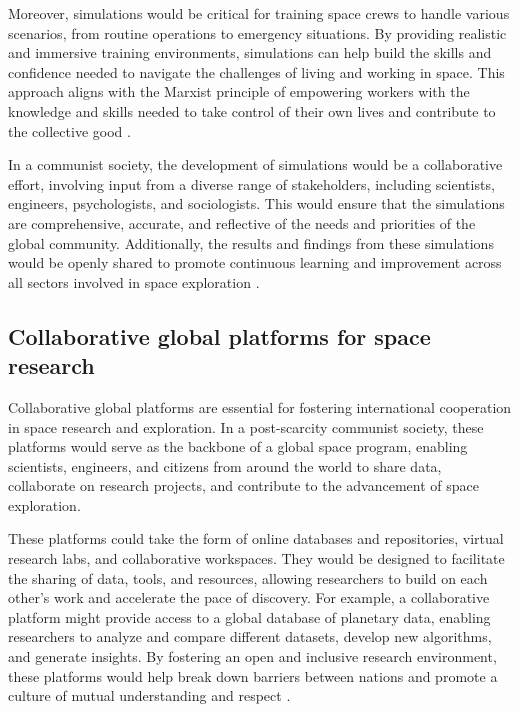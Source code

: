 Moreover, simulations would be critical for training space crews to handle various scenarios, from routine operations to emergency situations. By providing realistic and immersive training environments, simulations can help build the skills and confidence needed to navigate the challenges of living and working in space. This approach aligns with the Marxist principle of empowering workers with the knowledge and skills needed to take control of their own lives and contribute to the collective good \cite[pp.~67-70]{debord1967}.

In a communist society, the development of simulations would be a collaborative effort, involving input from a diverse range of stakeholders, including scientists, engineers, psychologists, and sociologists. This would ensure that the simulations are comprehensive, accurate, and reflective of the needs and priorities of the global community. Additionally, the results and findings from these simulations would be openly shared to promote continuous learning and improvement across all sectors involved in space exploration \cite[pp.~78-81]{bookchin1986}.

\subsection{Collaborative global platforms for space research}

Collaborative global platforms are essential for fostering international cooperation in space research and exploration. In a post-scarcity communist society, these platforms would serve as the backbone of a global space program, enabling scientists, engineers, and citizens from around the world to share data, collaborate on research projects, and contribute to the advancement of space exploration.

These platforms could take the form of online databases and repositories, virtual research labs, and collaborative workspaces. They would be designed to facilitate the sharing of data, tools, and resources, allowing researchers to build on each other's work and accelerate the pace of discovery. For example, a collaborative platform might provide access to a global database of planetary data, enabling researchers to analyze and compare different datasets, develop new algorithms, and generate insights. By fostering an open and inclusive research environment, these platforms would help break down barriers between nations and promote a culture of mutual understanding and respect \cite[pp.~78-81]{bookchin1986}.

